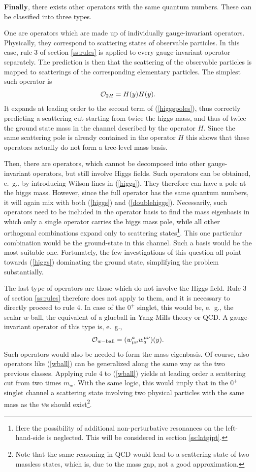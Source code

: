 \documentclass[final,12pt]{article}
\newcommand*{\no}{\noindent}
\newcommand*{\be}{\begin{equation}}
\newcommand*{\ee}{\end{equation}}
\newcommand*{\pref}[1]{(\ref{#1})}
\newcommand*{\mn}{{\mu\nu}}
\newcommand*{\1}{1\!\!\!\bot}
\newcommand*{\op}{{\cal O}}
\begin{document}
{\bf Finally}, there exists other operators with the same quantum numbers. These can be classified into three types.

One are operators which are made up of individually gauge-invariant operators. Physically, they correspond to scattering states of observable particles. In this case, rule 3 of section \ref{ss:rules} is applied to every gauge-invariant operator separately. The prediction is then that the scattering of the observable particles is mapped to scatterings of the corresponding elementary particles. The simplest such operator is
\be
{\cal O}_{2H}=H(y)H(y)\label{doublehiggs}.
\ee
\no It expands at leading order to the second term of \pref{higgspoles}, thus correctly predicting a scattering cut starting from twice the higgs mass, and thus of twice the ground state mass in the channel described by the operator $H$. Since the same scattering pole is already contained in the operator $H$ this shows that these operators actually do not form a tree-level mass basis.

Then, there are operators, which cannot be decomposed into other gauge-invariant operators, but still involve Higgs fields. Such operators can be obtained, e.\ g., by introducing Wilson lines in \pref{higgs}. They therefore can have a pole at the higgs mass. However, since the full operator has the same quantum numbers, it will again mix with both \pref{higgs} and \pref{doublehiggs}. Necessarily, such operators need to be included in the operator basis to find the mass eigenbasis in which only a single operator carries the higgs mass pole, while all other orthogonal combinations expand only to scattering states\footnote{Here the possibility of additional non-perturbative resonances on the left-hand-side is neglected. This will be considered in section \ref{ss:latgipt}.}. This one particular combination would be the ground-state in this channel. Such a basis would be the most suitable one. Fortunately, the few investigations of this question \cite{Maas:2013aia,Maas:2014pba,Wurtz:2013ova} all point towards \pref{higgs} dominating the ground state, simplifying the problem substantially.

The last type of operators are those which do not involve the Higgs field. Rule 3 of section \ref{ss:rules} therefore does not apply to them, and it is necessary to directly proceed to rule 4. In case of the $0^{+}$ singlet, this would be, e.\ g., the scalar $w$-ball, the equivalent of a glueball in Yang-Mills theory or QCD. A gauge-invariant operator of this type is, e.\ g.,
\be
\op_{w\mathrm{-ball}}=(w_\mn^a w^\mn_a)(y)\label{wball}.
\ee
\no Such operators would also be needed to form the mass eigenbasis. Of course, also operators like \pref{wball} can be generalized along the same way as the two previous classes. Applying rule 4 to \pref{wball} yields at leading order a scattering cut from two times $m_w$. With the same logic, this would imply that in the $0^+$ singlet channel a scattering state involving two physical particles with the same mass as the $w$s should exist\footnote{Note that the same reasoning in QCD would lead to a scattering state of two massless states, which is, due to the mass gap, not a good approximation.}.
\end{document}
